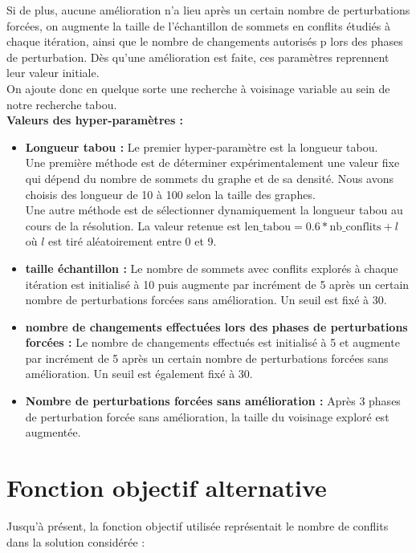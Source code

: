 \documentclass{article}
\begin{document}
Si de plus, aucune amélioration n'a lieu après un certain nombre de perturbations forcées, on augmente la taille de l'échantillon de sommets en conflits étudiés à chaque itération, ainsi que le nombre de changements autorisés p lors des phases de perturbation.
Dès qu'une amélioration est faite, ces paramètres reprennent leur valeur initiale.\\
On ajoute donc en quelque sorte une recherche à voisinage variable au sein de notre recherche tabou.
\vspace{0.3cm}\\
\noindent \textbf{Valeurs des hyper-paramètres : }
\vspace{-0.3cm}\\
\begin{itemize}
    \item \textbf{Longueur tabou : } Le premier hyper-paramètre est la longueur tabou. \\
    Une première méthode est de déterminer expérimentalement une valeur fixe qui dépend du nombre de sommets du graphe et de sa densité. Nous avons choisis des longueur de 10 à 100 selon la taille des graphes.\\
    Une autre méthode est de sélectionner dynamiquement la longueur tabou au cours de la résolution. La valeur retenue est $\text{len_tabou} = 0.6*\text{nb_conflits} + l$ où $l$ est tiré aléatoirement entre 0 et 9.
    \item \textbf{taille échantillon : } Le nombre de sommets avec conflits explorés à chaque itération est initialisé à 10 puis augmente par incrément de 5 après un certain nombre de perturbations forcées sans amélioration. Un seuil est fixé à 30.
    \item \textbf{nombre de changements effectuées lors des phases de perturbations forcées : } Le nombre de changements effectués est initialisé à 5 et augmente par incrément de 5 après un certain nombre de perturbations forcées sans amélioration. Un seuil est également fixé à 30.
    \item \textbf{Nombre de perturbations forcées sans amélioration :} Après 3 phases de perturbation forcée sans amélioration, la taille du voisinage exploré est augmentée.
\end{itemize}

\section{Fonction objectif alternative}
Jusqu'à présent, la fonction objectif utilisée représentait le nombre de conflits dans la solution considérée : 
\end{document}
